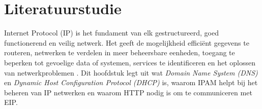 \documentclass{hogent-article}
\begin{document}


\section{Literatuurstudie}
\label{sec:begrippen}
Internet Protocol (IP) is het fundament van elk gestructureerd, goed functionerend en veilig netwerk. Het geeft de mogelijkheid efficiënt gegevens te routeren, netwerken te verdelen in meer beheersbare eenheden, toegang te beperken tot gevoelige data of systemen, services te identificeren en het oplossen van netwerkproblemen \autocite{Postel1981}. Dit hoofdstuk legt uit wat \textit{Domain Name System (DNS)} en \textit{Dynamic Host Configuration Protocol (DHCP)} is, waarom IPAM helpt bij het beheren van IP netwerken en waarom HTTP nodig is om te communiceren met EIP. 
\end{document}
